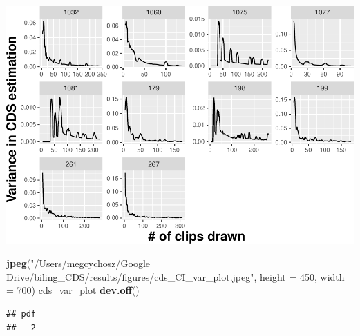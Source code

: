 \documentclass[
]{article}
\newenvironment{Shaded}{\begin{snugshade}}{\end{snugshade}}
\newcommand{\DataTypeTok}[1]{\textcolor[rgb]{0.13,0.29,0.53}{#1}}
\newcommand{\DecValTok}[1]{\textcolor[rgb]{0.00,0.00,0.81}{#1}}
\newcommand{\KeywordTok}[1]{\textcolor[rgb]{0.13,0.29,0.53}{\textbf{#1}}}
\newcommand{\NormalTok}[1]{#1}
\newcommand{\StringTok}[1]{\textcolor[rgb]{0.31,0.60,0.02}{#1}}
\begin{document}
\includegraphics{validation_results_files/figure-latex/plot rolling CDS variances-1.pdf}

\begin{Shaded}
\begin{Highlighting}[]
\KeywordTok{jpeg}\NormalTok{(}\StringTok{"/Users/megcychosz/Google Drive/biling_CDS/results/figures/cds_CI_var_plot.jpeg"}\NormalTok{, }\DataTypeTok{height =} \DecValTok{450}\NormalTok{, }\DataTypeTok{width =} \DecValTok{700}\NormalTok{)}
\NormalTok{cds_var_plot}
\KeywordTok{dev.off}\NormalTok{()}
\end{Highlighting}
\end{Shaded}

\begin{verbatim}
## pdf 
##   2
\end{verbatim}
\end{document}
